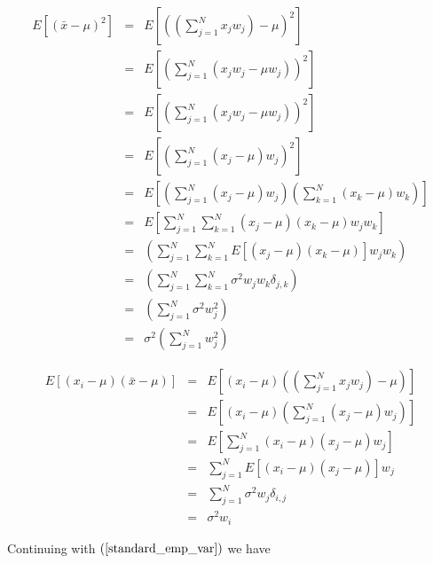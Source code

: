 \documentclass{article}
\begin{document}
\begin{eqnarray}
    E\left[ ({\bar x} - \mu)^2 \right] & = & E \left[\left( \left(\sum_{j=1}^N x_j w_j\right) - \mu \right)^2\right] \nonumber \\
     & = & E\left[\left( \sum_{j=1}^N (x_j w_j - \mu w_j) \right)^2\right] \nonumber \\
     & = &  E\left[ \left( \sum_{j=1}^N (x_j w_j - \mu w_j) \right)^2\right] \nonumber \\
     & = &  E\left[ \left( \sum_{j=1}^N (x_j - \mu)w_j \right)^2\right] \nonumber \\
     & = &  E\left[ \left( \sum_{j=1}^N (x_j - \mu)w_j \right) \left(\sum_{k=1}^N (x_k - \mu) w_k\right)\right] \nonumber \\
     & = &  E\left[ \sum_{j=1}^N \sum_{k=1}^N  (x_j - \mu) (x_k - \mu) w_j w_k \right]  \nonumber \\
     & = &  \left( \sum_{j=1}^N \sum_{k=1}^N  E\left[(x_j - \mu) (x_k - \mu) \right]w_j w_k\right) \nonumber  \\
     & = &  \left( \sum_{j=1}^N \sum_{k=1}^N  \sigma^2 w_j w_k \delta_{j,k}\right) \nonumber  \\
     & = &  \left( \sum_{j=1}^N \sigma^2 w_j^2 \right)  \nonumber \\
     & = &  \sigma^2 \left( \sum_{j=1}^N w_j^2 \right)  
\end{eqnarray}

\begin{eqnarray}
    E\left[(x_i - \mu)({\bar x} - \mu)\right]  & = & E\left[ (x_i - \mu) \left( \left( \sum_{j=1}^N x_j w_j\right) - \mu \right)  \right] \nonumber \\ 
    & = & E\left[ (x_i - \mu) \left( \sum_{j=1}^N (x_j - \mu)w_j\right) \right] \nonumber \\ 
    & = & E\left[ \sum_{j=1}^N (x_i - \mu) (x_j - \mu)w_j \right] \nonumber \\ 
    & = & \sum_{j=1}^N E\left[(x_i - \mu) (x_j - \mu) \right] w_j \nonumber \\ 
    & = & \sum_{j=1}^N \sigma^2 w_j \delta_{i,j} \nonumber \\ 
    & = & \sigma^2 w_i  \nonumber 
\end{eqnarray}

Continuing with $(\ref{standard_emp_var})$ we have
\end{document}
